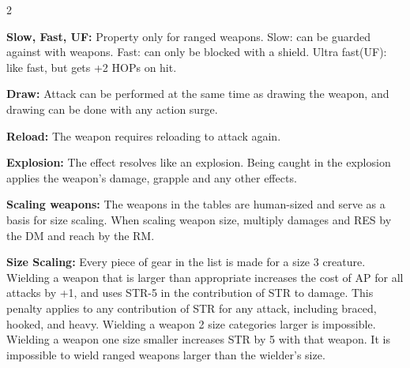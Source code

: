\begin{multicols}{2}
\begin{proplist}
\item \textbf{Slow, Fast, UF:} Property only for ranged weapons. Slow: can be guarded against with weapons. Fast: can only be blocked with a shield. Ultra fast(UF): like fast, but gets +2 HOPs on hit.
\item \textbf{Draw:} Attack can be performed at the same time as drawing the weapon, and drawing can be done with any action surge.
\item \textbf{Reload:} The weapon requires reloading to attack again.
\item \textbf{Explosion:} The effect resolves like an explosion. Being caught in the explosion applies the weapon's damage, grapple and any other effects.
\end{proplist}


\textbf{Scaling weapons:} The weapons in the tables are human-sized and serve as a basis for size scaling. When scaling weapon size, multiply damages and RES by the DM and reach by the RM.

\textbf{Size Scaling:} Every piece of gear in the list is made for a size 3 creature. Wielding a weapon that is larger than appropriate increases the cost of AP for all attacks by +1, and uses STR-5 in the contribution of STR to damage. This penalty applies to any contribution of STR for any attack, including braced, hooked, and heavy. Wielding a weapon 2 size categories larger is impossible. Wielding a weapon one size smaller increases STR by 5 with that weapon. It is impossible to wield ranged weapons larger than the wielder's size.

\end{multicols}


